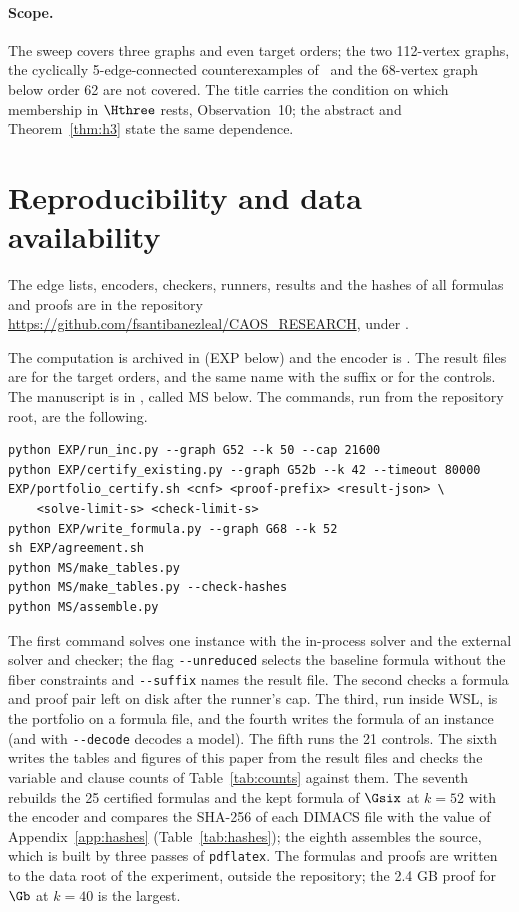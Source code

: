 \paragraph{Scope.} The sweep covers three graphs and even target orders; the two 112-vertex graphs, the cyclically 5-edge-connected counterexamples of~\cite{GJMMMU2026} and the 68-vertex graph below order 62 are not covered. The title carries the condition on which membership in $\Hthree$ rests, Observation~10; the abstract and Theorem~\ref{thm:h3} state the same dependence.

\section{Reproducibility and data availability}\label{sec:reproducibility}

The edge lists, encoders, checkers, runners, results and the hashes of all formulas and proofs are in the repository \url{https://github.com/fsantibanezleal/CAOS_RESEARCH}, under . \raggedright The computation is archived in  (EXP below) and the encoder is .
The result files are  for the target orders, and the same name with the suffix  or  for the controls. The manuscript is in , called MS below. The commands, run from the repository root, are the following.
\begin{verbatim}
python EXP/run_inc.py --graph G52 --k 50 --cap 21600
python EXP/certify_existing.py --graph G52b --k 42 --timeout 80000
EXP/portfolio_certify.sh <cnf> <proof-prefix> <result-json> \
    <solve-limit-s> <check-limit-s>
python EXP/write_formula.py --graph G68 --k 52
sh EXP/agreement.sh
python MS/make_tables.py
python MS/make_tables.py --check-hashes
python MS/assemble.py
\end{verbatim}
The first command solves one instance with the in-process solver and the external solver and checker; the flag \texttt{-{}-unreduced} selects the baseline formula without the fiber constraints and \texttt{-{}-suffix} names the result file. The second checks a formula and proof pair left on disk after the runner's cap. The third, run inside WSL, is the portfolio on a formula file, and
the fourth writes the formula of an instance (and with \texttt{-{}-decode} decodes a model). The fifth runs the 21 controls. The sixth writes the tables and figures of this paper from the result files and checks the variable and clause counts of Table~\ref{tab:counts} against them. The seventh rebuilds the 25 certified formulas and the kept formula of $\Gsix$ at $k = 52$ with the encoder and compares the SHA-256
of each DIMACS file with the value of Appendix~\ref{app:hashes} (Table~\ref{tab:hashes}); the eighth assembles the source, which is built by three passes of \texttt{pdflatex}. The formulas and proofs are written to the data root of the experiment, outside the repository; the 2.4 GB proof for $\Gb$ at $k = 40$ is the largest.

